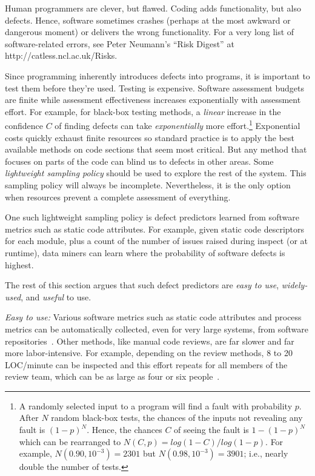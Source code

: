 Human programmers are clever, but flawed. Coding  adds functionality, but also defects.
Hence, software sometimes crashes (perhaps at the most awkward or dangerous moment) or delivers
the wrong functionality. For a very long list of software-related errors,
see  Peter Neumann's ``Risk Digest'' at http://catless.ncl.ac.uk/Risks.

Since programming inherently
introduces defects into  programs, it is important to test them before they're used.
Testing is expensive.
Software assessment budgets are finite
while assessment effectiveness increases
exponentially with assessment effort.
For example, for  black-box testing methods,
a {\em linear} increase
in the confidence $C$ of finding  defects
can take {\em exponentially} more effort.\footnote{A randomly selected
input to a program will find a fault with probability $p$.
After $N$ random black-box tests, the chances of the inputs
not revealing any fault
is $(1-p)^N$. Hence, the chances $C$ of seeing the fault is $1-(1-p)^N$
which can be rearranged to
 $N(C,p)=log(1 -
C)/log(1-p)$. For example, $N(0.90,10^{-3})=2301$
but $N(0.98,10^{-3})=3901$; i.e., nearly double the number of tests.}
Exponential costs quickly exhaust finite resources so
standard practice is to apply the best
available  methods on code sections that seem most critical.
But any method that focuses on parts of the code
can blind us to defects in other areas. Some  {\em lightweight sampling policy} should be used to explore the rest of the system.
This sampling policy will always be incomplete.
Nevertheless, it is the only option when
resources prevent a complete assessment of everything.

One such lightweight sampling policy is defect predictors learned from software metrics such as static code attributes.
For example, given static code descriptors for each module, plus a count of the number of issues raised during inspect (or at runtime),
data miners can learn where the probability of software defects is highest.


The rest of this section argues that such defect predictors are   {\em easy to
use}, {\em widely-used}, and {\em useful} to use.

{\em Easy to use:} Various software metrics such as static code attributes and process metrics can be automatically collected, even for very large systems, from software repositories~\cite{Basili96,Halstead77,McCabe76,nagappan05,Rahman13}.
Other methods, like  manual code reviews, are far slower and far more labor-intensive.
For example, depending on the review methods, 8 to 20 LOC/minute can be
inspected and this effort repeats for all members of the review team,
which can be as large as four or six people~\cite{me02f}.


